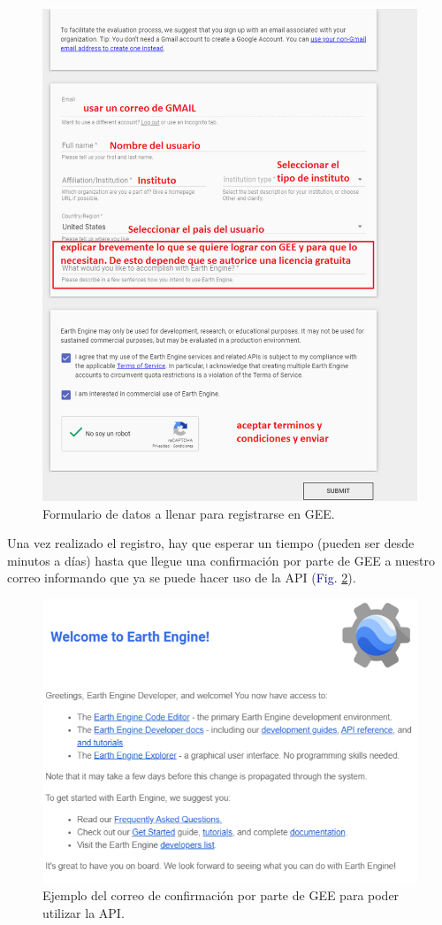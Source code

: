 \documentclass[
  12pt,
  letterpaper,
  twoside]{book}
\begin{document}
\begin{figure}[H]

{\centering \includegraphics[width=0.8\linewidth]{Img/formulario} 

}

\caption{Formulario de datos a llenar para registrarse en GEE.}\label{fig:f22}
\end{figure}

Una vez realizado el registro, hay que esperar un tiempo (pueden ser desde minutos a días) hasta que llegue una confirmación por parte de GEE a nuestro correo informando que ya se puede hacer uso de la API (\textcolor{darkblue}{Fig.} \ref{fig:f23}).

\begin{figure}[H]

{\centering \includegraphics[width=0.6\linewidth]{Img/correo} 

}

\caption{Ejemplo del correo de confirmación por parte de GEE para poder utilizar la API.}\label{fig:f23}
\end{figure}
\end{document}
